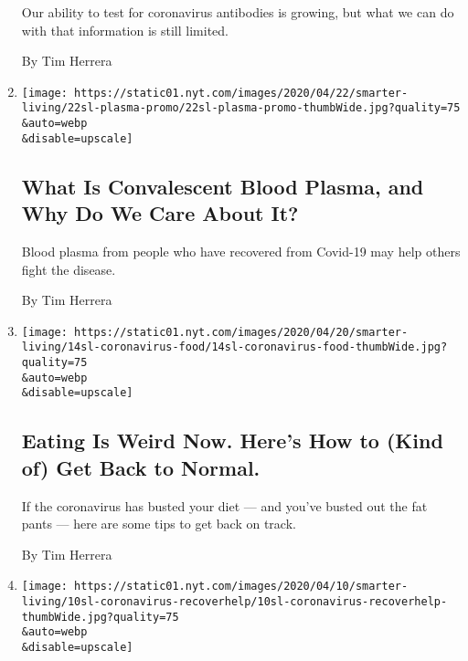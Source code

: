 \begin{enumerate}
  Our ability to test for coronavirus antibodies is growing, but what we
  can do with that information is still limited.

  By Tim Herrera
\item
  \href{/2020/04/24/smarter-living/coronavirus-convalescent-plasma-antibodies.html}{}

  \texttt{[image: https://static01.nyt.com/images/2020/04/22/smarter-living/22sl-plasma-promo/22sl-plasma-promo-thumbWide.jpg?quality=75\\\&auto=webp\\\&disable=upscale]}

  \hypertarget{what-is-convalescent-blood-plasma-and-why-do-we-care-about-it}{%
  \subsection{What Is Convalescent Blood Plasma, and Why Do We Care
  About
  It?}\label{what-is-convalescent-blood-plasma-and-why-do-we-care-about-it}}

  Blood plasma from people who have recovered from Covid-19 may help
  others fight the disease.

  By Tim Herrera
\item
  \href{/2020/04/15/smarter-living/coronavirus-eating-advice.html}{}

  \texttt{[image: https://static01.nyt.com/images/2020/04/20/smarter-living/14sl-coronavirus-food/14sl-coronavirus-food-thumbWide.jpg?quality=75\\\&auto=webp\\\&disable=upscale]}

  \hypertarget{eating-is-weird-now-heres-how-to-kind-of-get-back-to-normal}{%
  \subsection{Eating Is Weird Now. Here's How to (Kind of) Get Back to
  Normal.}\label{eating-is-weird-now-heres-how-to-kind-of-get-back-to-normal}}

  If the coronavirus has busted your diet --- and you've busted out the
  fat pants --- here are some tips to get back on track.

  By Tim Herrera
\item
  \href{/2020/04/12/smarter-living/coronavirus-recovered-how-to-help.html}{}

  \texttt{[image: https://static01.nyt.com/images/2020/04/10/smarter-living/10sl-coronavirus-recoverhelp/10sl-coronavirus-recoverhelp-thumbWide.jpg?quality=75\\\&auto=webp\\\&disable=upscale]}

  \hypertarget{recovered-from-coronavirus-heres-how-you-can-help}{%
}
\end{enumerate}
